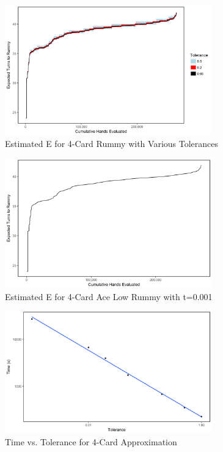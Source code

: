 \documentclass[letter,12pt]{article}
\begin{document}
\begin{figure}
\centering
\includegraphics[width=0.8\textwidth]{fig9.png}
\caption{Estimated E for 4-Card Rummy with Various Tolerances}\label{fig:9}
\end{figure}

\begin{figure}
\centering
\includegraphics[width=0.8\textwidth]{fig10.png}
\caption{Estimated E for 4-Card Ace Low Rummy with t=0.001}\label{fig:10}
\end{figure}

\begin{figure}
\centering
\includegraphics[width=0.8\textwidth]{fig11.png}
\caption{Time vs. Tolerance for 4-Card Approximation}\label{fig:11}
\end{figure}
\end{document}
